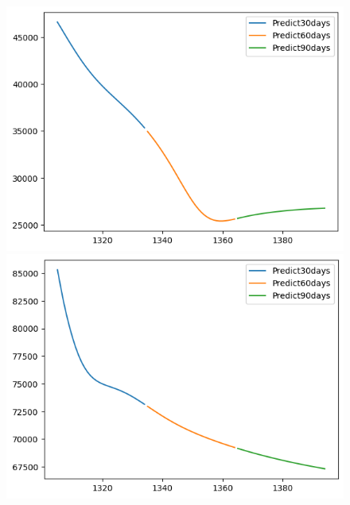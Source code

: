 \begin{figure}[H]
    \hfill
        \begin{minipage}{0.15\textwidth}
    \centering
    \includegraphics[width=1\textwidth]{resources/chapter-5/newdata1/predicted/BIDV_LSTM_9-1_30days.png}
    \end{minipage}
    \hfill
    \begin{minipage}{0.15\textwidth}
    \centering
    \includegraphics[width=1\textwidth]{resources/chapter-5/newdata1/predicted/VCB_ LSTM_7-3_30days.png}
    \end{minipage}
    \hfill
    \begin{minipage}{0.15\textwidth}
    \centering

\end{minipage}
\end{figure}
